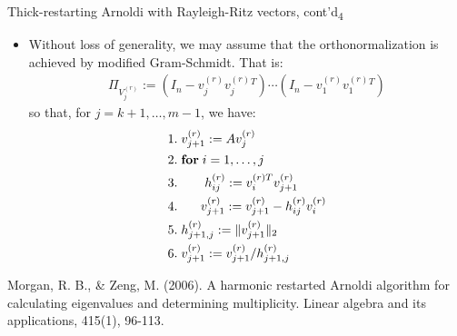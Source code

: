 \documentclass[t,usepdftitle=false]{beamer}
\begin{document}
\begin{frame}{Thick-restarting Arnoldi with Rayleigh-Ritz vectors, cont'd\textsubscript{4}}
\begin{itemize}
\item Without loss of generality, we may assume that the orthonormalization is achieved by modified Gram-Schmidt.
That is:
\begin{align*}
\Pi_{V_j^{(r)}}:=\left(I_n-v_j^{(r)}v_j^{(r)}{}^T\right)\cdots\left(I_n-v_1^{(r)}v_1^{(r)}{}^T\right)
\end{align*}
so that, for $j=k+1,\dots,m-1$, we have:
\begin{align*}
1.&\;v_{j+1}^{(r)}:=Av_{j}^{(r)}\\
2.&\;\textbf{for}\;i=1,\dots,j\\
3.&\hspace{.75cm}h_{ij}^{(r)}:=v_{i}^{(r)T}v_{j+1}^{(r)}\\
4.&\hspace{.64cm}v_{j+1}^{(r)}:=v_{j+1}^{(r)}-h_{ij}^{(r)}v_{i}^{(r)}\\
5.&\;h_{j+1,j}^{(r)}:=\|v_{j+1}^{(r)}\|_2\\
6.&\;v_{j+1}^{(r)}:=v_{j+1}^{(r)}/h_{j+1,j}^{(r)}
\end{align*}
\end{itemize}\smallskip
\tiny{Morgan, R. B., \& Zeng, M. (2006). A harmonic restarted Arnoldi algorithm for calculating eigenvalues and determining
multiplicity. Linear algebra and its applications, 415(1), 96-113.}
\end{frame}
\end{document}
